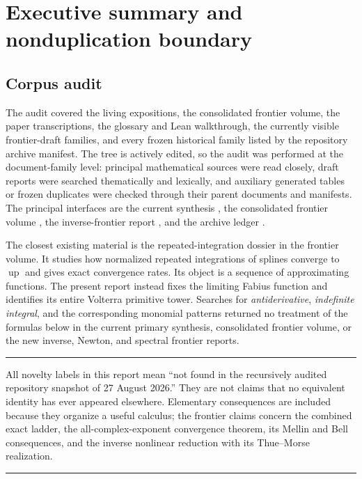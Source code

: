 \documentclass[11pt,oneside]{article}
\numberwithin{equation}{section}
\theoremstyle{definition}
\theoremstyle{remark}
\newcommand{\Up}{\operatorname{up}}
\newenvironment{boxedremark}{%
  \par\smallskip\noindent\begin{center}\begin{minipage}{0.94\textwidth}%
  \color{black}\hrule\vspace{0.6em}\small
}{%
  \vspace{0.6em}\hrule\end{minipage}\end{center}\smallskip
}
\begin{document}
\tableofcontents
\newpage

\section{Executive summary and nonduplication boundary}
\label{sec:executive}

\subsection{Corpus audit}
The audit covered the living expositions, the consolidated frontier volume, the
paper transcriptions, the glossary and Lean walkthrough, the currently visible
frontier-draft families, and every frozen historical family listed by the
repository archive manifest.  The tree is actively edited, so the audit was
performed at the document-family level: principal mathematical sources were
read closely, draft reports were searched thematically and lexically, and
auxiliary generated tables or frozen duplicates were checked through their
parent documents and manifests.  The principal interfaces are the current
synthesis \cite{ProveItPrimary}, the consolidated frontier volume
\cite{ProveItFrontiers}, the inverse-frontier report \cite{ProveItInverse}, and
the archive ledger \cite{ProveItArchive}.

The closest existing material is the repeated-integration dossier in the
frontier volume.  It studies how normalized repeated integrations of splines
converge to $\Up$ and gives exact convergence rates.  Its object is a sequence
of approximating functions.  The present report instead fixes the limiting
Fabius function and identifies its entire Volterra primitive tower.  Searches
for \emph{antiderivative}, \emph{indefinite integral}, and the corresponding
monomial patterns returned no treatment of the formulas below in the current
primary synthesis, consolidated frontier volume, or the new inverse, Newton,
and spectral frontier reports.

\begin{boxedremark}
All novelty labels in this report mean ``not found in the recursively audited
repository snapshot of 27 August 2026.''  They are not claims that no equivalent
identity has ever appeared elsewhere.  Elementary consequences are included
because they organize a useful calculus; the frontier claims concern the
combined exact ladder, the all-complex-exponent convergence theorem, its Mellin
and Bell consequences, and the inverse nonlinear reduction with its
Thue--Morse realization.
\end{boxedremark}
\end{document}
